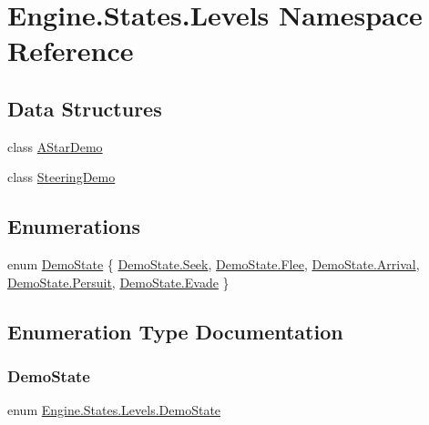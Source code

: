 \hypertarget{a00279}{}\section{Engine.\+States.\+Levels Namespace Reference}
\label{a00279}
\subsection*{Data Structures}
\begin{DoxyCompactItemize}
\item 
class \hyperlink{a00562}{A\+Star\+Demo}
\item 
class \hyperlink{a00570}{Steering\+Demo}
\end{DoxyCompactItemize}
\subsection*{Enumerations}
\begin{DoxyCompactItemize}
\item 
enum \hyperlink{a00279_a6ec33a1c7bddde5743b33ce8f3d41fcc}{Demo\+State} \{ \newline
\hyperlink{a00279_a6ec33a1c7bddde5743b33ce8f3d41fccaed7ecb1dbb9be8c65f909819dac7aa54}{Demo\+State.\+Seek}, 
\hyperlink{a00279_a6ec33a1c7bddde5743b33ce8f3d41fcca20a8b1e6e473f9f1b219973fb365af44}{Demo\+State.\+Flee}, 
\hyperlink{a00279_a6ec33a1c7bddde5743b33ce8f3d41fcca885b3c534ec909cf87987897bfba2235}{Demo\+State.\+Arrival}, 
\hyperlink{a00279_a6ec33a1c7bddde5743b33ce8f3d41fcca09a6ef77969b3d19389bf96746c485d9}{Demo\+State.\+Persuit}, 
\newline
\hyperlink{a00279_a6ec33a1c7bddde5743b33ce8f3d41fccafcebb8bec493a6678a2758580bee43f9}{Demo\+State.\+Evade}
 \}
\end{DoxyCompactItemize}


\subsection{Enumeration Type Documentation}
\mbox{\label{a00279_a6ec33a1c7bddde5743b33ce8f3d41fcc}} 
\subsubsection{\texorpdfstring{Demo\+State}{DemoState}}
{\footnotesize\ttfamily enum \hyperlink{a00279_a6ec33a1c7bddde5743b33ce8f3d41fcc}{Engine.\+States.\+Levels.\+Demo\+State}\hspace{0.3cm}{\ttfamily [strong]}}

